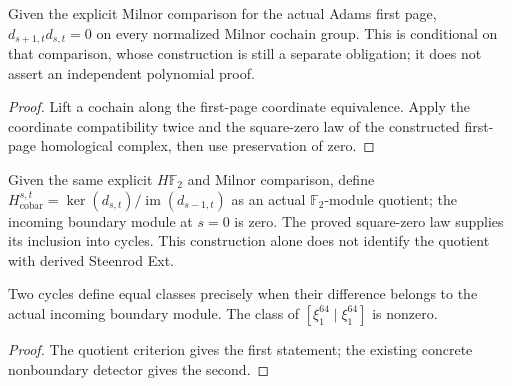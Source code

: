 \begin{proposition}
  \label{prop:cobar-square-zero-from-comparison}
  \leanok
  Given the explicit Milnor comparison for the actual Adams first page,
  $d_{s+1,t}d_{s,t}=0$ on every normalized Milnor cochain group.
  This is conditional on that comparison, whose construction is still a
  separate obligation; it does not assert an independent polynomial proof.
\end{proposition}
\begin{proof}
  Lift a cochain along the first-page coordinate equivalence. Apply the
  coordinate compatibility twice and the square-zero law of the constructed
  first-page homological complex, then use preservation of zero.
  \leanok
\end{proof}

\begin{definition}
  \label{def:milnor-cobar-cohomology}
  \leanok
  Given the same explicit $H\mathbb F_2$ and Milnor comparison, define
  $H^{s,t}_{\mathrm{cobar}}=\ker(d_{s,t})/\operatorname{im}(d_{s-1,t})$
  as an actual $\mathbb F_2$-module quotient; the incoming boundary module
  at $s=0$ is zero. The proved square-zero law supplies its inclusion into
  cycles. This construction alone does not identify the quotient with
  derived Steenrod Ext.
\end{definition}

\begin{proposition}
  \label{prop:milnor-cobar-class-criteria}
  \leanok
  Two cycles define equal classes precisely when their difference belongs
  to the actual incoming boundary module. The class of
  $[\xi_1^{64}\mid\xi_1^{64}]$ is nonzero.
\end{proposition}
\begin{proof}
  The quotient criterion gives the first statement; the existing concrete
  nonboundary detector gives the second.
  \leanok
\end{proof}

